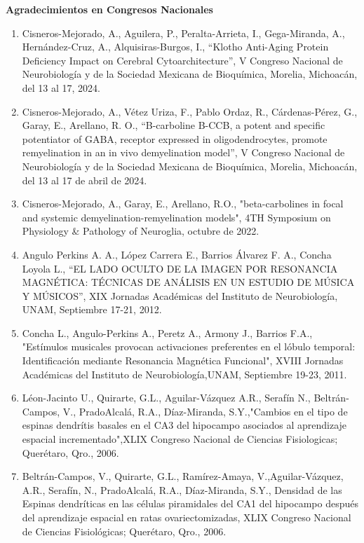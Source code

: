 \textbf{Agradecimientos en Congresos Nacionales}

\hfill

\begin{enumerate}

\item Cisneros-Mejorado, A., Aguilera, P., Peralta-Arrieta, I., Gega-Miranda, A., Hernández-Cruz, A., Alquisiras-Burgos, I., 
“Klotho Anti-Aging Protein Deficiency Impact on Cerebral Cytoarchitecture”, V Congreso Nacional de Neurobiología y de la 
Sociedad Mexicana de Bioquímica, Morelia, Michoacán, del 13 al 17, 2024.

\item Cisneros-Mejorado, A., Vétez Uriza, F., Pablo Ordaz, R., Cárdenas-Pérez, G., Garay, E., Arellano, R. O., “B-carboline B-CCB, a potent and 
specific potentiator of GABA, receptor expressed in oligodendrocytes, promote 
remyelination in an in vivo demyelination model”, V Congreso Nacional de Neurobiología y de la Sociedad Mexicana de 
Bioquímica, Morelia, Michoacán, del 13 al 17 de abril de 2024.

\item Cisneros-Mejorado, A., Garay, E., Arellano, R.O., "beta-carbolines in focal and systemic demyelination-remyelination 
models", 4TH Symposium on Physiology \& Pathology of Neuroglia, octubre de 2022.

\item Angulo Perkins A. A., López Carrera E., Barrios Álvarez F. A., Concha Loyola L., “EL LADO OCULTO DE LA IMAGEN POR 
RESONANCIA MAGNÉTICA: TÉCNICAS DE ANÁLISIS EN UN ESTUDIO DE MÚSICA Y MÚSICOS”, XIX Jornadas Académicas del Instituto de 
Neurobiología, UNAM, Septiembre 17-21, 2012.

\item Concha L., Angulo-Perkins A., Peretz A., Armony J., Barrios F.A., "Estímulos musicales provocan activaciones preferentes 
en el lóbulo temporal: Identificación mediante Resonancia Magnética Funcional", XVIII Jornadas Académicas del Instituto de 
Neurobiología,UNAM, Septiembre 19-23, 2011.

\item Léon-Jacinto U., Quirarte, G.L., Aguilar-Vázquez A.R., Serafín N., Beltrán-Campos, V., PradoAlcalá, R.A., Díaz-Miranda, 
S.Y.,"Cambios en el tipo de espinas dendrítis basales en el CA3 del hipocampo asociados al aprendizaje espacial 
incrementado",XLIX Congreso Nacional de Ciencias Fisiologicas; Querétaro, Qro., 2006.

\item Beltrán-Campos, V., Quirarte, G.L., Ramírez-Amaya, V.,Aguilar-Vázquez, A.R., Serafín, N., PradoAlcalá, R.A., 
Díaz-Miranda, S.Y., Densidad de las Espinas dendríticas en las células piramidales del CA1 del hipocampo después del 
aprendizaje espacial en ratas ovariectomizadas, XLIX Congreso Nacional de Ciencias Fisiológicas; Querétaro, Qro., 2006.


\end{enumerate}
